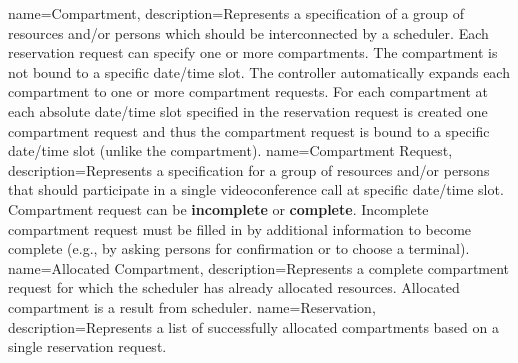 {
  name=Compartment,
  description={Represents a specification of a group of resources and/or 
    persons which should be interconnected by a scheduler. Each reservation 
    request can specify one or more compartments. The compartment is not
    bound to a specific date/time slot. The controller automatically expands 
    each compartment to one or more compartment requests. For each compartment 
    at each absolute date/time slot specified in the reservation request is 
    created one compartment request and thus the compartment request is bound 
    to a specific date/time slot (unlike the compartment).}
}
{
  name=Compartment Request,
  description={Represents a specification for a group of resources and/or
    persons that should participate in a single videoconference call at 
    specific date/time slot. Compartment request can be \textbf{incomplete} 
    or \textbf{complete}. Incomplete compartment request must be filled in by 
    additional information to become complete (e.g., by asking persons for 
    confirmation or to choose a terminal).}
}
{
  name=Allocated Compartment,
  description={Represents a complete compartment request for which the 
    scheduler has already allocated resources. Allocated compartment 
    is a result from scheduler.}
}
{
  name=Reservation,
  description={Represents a list of successfully allocated compartments
    based on a single reservation request.}
}

\renewcommand*{\glossaryname}{List of Terms}  %
\renewcommand*{\glspostdescription}{}         %
\renewcommand*{\glsnamefont}[1]{\textbf{#1}}  %
\renewcommand*{\arraystretch}{1.4}            %
\renewcommand*\glossarypreamble{\addcontentsline{toc}{chapter}{\glossaryname}}
\setlength{\glspagelistwidth}{0.1\linewidth}
\setlength{}        %
\glsaddall                                    %
\renewcommand*{\glsgroupskip}{}               %
\printglossary[type=main]                     %

